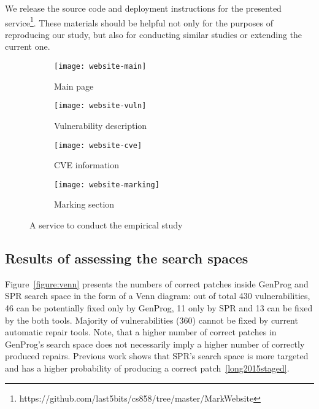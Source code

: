 We release the source code and deployment instructions for the presented service\footnote{https://github.com/last5bits/cs858/tree/master/MarkWebsite}.
These materials should be helpful not only for the purposes of reproducing our study, but also for conducting similar studies or extending the current one.

\begin{figure}[t!]

\begin{subfigure}[b]{\linewidth}
    \texttt{[image: website-main]}
    \caption{Main page}
    \label{figure:website-main}
\end{subfigure}

\begin{subfigure}[b]{\linewidth}
    \texttt{[image: website-vuln]}
    \caption{Vulnerability description}
    \label{figure:website-vuln}
\end{subfigure}

\begin{subfigure}[b]{\linewidth}
    \texttt{[image: website-cve]}
    \caption{CVE information}
    \label{figure:website-cve}
\end{subfigure}

\begin{subfigure}[b]{\linewidth}
    \texttt{[image: website-marking]}
    \caption{Marking section}
    \label{figure:website-marking}
\end{subfigure}

\caption{A service to conduct the empirical study}
\label{figure:website}
\end{figure}

\subsection{Results of assessing the search spaces}

Figure~\ref{figure:venn} presents the numbers of correct patches inside GenProg and SPR search space in the form of a Venn diagram: out of total 430 vulnerabilities, 46 can be potentially fixed only by GenProg, 11 only by SPR and 13 can be fixed by the both tools.
Majority of vulnerabilities (360) cannot be fixed by current automatic repair tools.
Note, that a higher number of correct patches in GenProg's search space does not necessarily imply a higher number of correctly produced repairs. Previous work shows that SPR's search space is more targeted and has a higher probability of producing a correct patch~\ref{long2015staged}.

